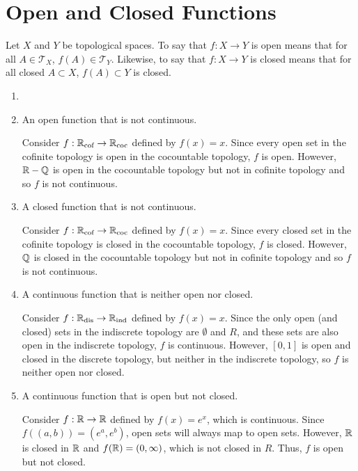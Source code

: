 \documentclass[letterpaper,12pt,fleqn]{article}
\newcommand{\T}{\mathscr{T}}
\begin{document}
\section*{Open and Closed Functions}

\begin{definition}
  Let \(X\) and \(Y\) be topological spaces.  To say that \(f:X\to Y\) is open means that for all \(A\in\T_X\),
  \(f(A)\in\T_Y\).  Likewise, to say that \(f:X\to Y\) is closed means that for all closed \(A\subset X\),
  \(f(A)\subset Y\) is closed.
\end{definition}

\begin{example}
  \begin{enumerate}
  \item[]
  \item An open function that is not continuous.

    Consider \(f:\mathbb{R}_{\text{cof}}\to\mathbb{R}_{\text{coc}}\) defined by \(f(x)=x\).  Since every open set in the cofinite
    topology is open in the cocountable topology, \(f\) is open.  However, \(\mathbb{R}-\mathbb{Q}\) is open in the cocountable
    topology but not in cofinite topology and so \(f\) is not continuous.

  \item A closed function that is not continuous.

    Consider \(f:\mathbb{R}_{\text{cof}}\to\mathbb{R}_{\text{coc}}\) defined by \(f(x)=x\).  Since every closed set in the cofinite
    topology is closed in the cocountable topology, \(f\) is closed.  However, \(\mathbb{Q}\) is closed in the cocountable
    topology but not in cofinite topology and so \(f\) is not continuous.

  \item A continuous function that is neither open nor closed.

    Consider \(f:\mathbb{R}_{\text{dis}}\to\mathbb{R}_{\text{ind}}\) defined by \(f(x)=x\).  Since the only open (and closed) sets
    in the indiscrete topology are \(\emptyset\) and \(R\), and these sets are also open in the indiscrete
    topology, \(f\) is continuous.  However, \([0,1]\) is open and closed in the discrete topology, but neither
    in the indiscrete topology, so \(f\) is neither open nor closed.

  \item A continuous function that is open but not closed.

    Consider \(f:\mathbb{R}\to\mathbb{R}\) defined by \(f(x)=e^x\), which is continuous.  Since \(f((a,b))=(e^a,e^b)\), open sets
    will always map to open sets.  However, \(\mathbb{R}\) is closed in \(\mathbb{R}\) and \(f(\mathbb{R})=(0,\infty)\), which is not
    closed in \(R\).  Thus, \(f\) is open but not closed.


\end{enumerate}
\end{example}
\end{document}

